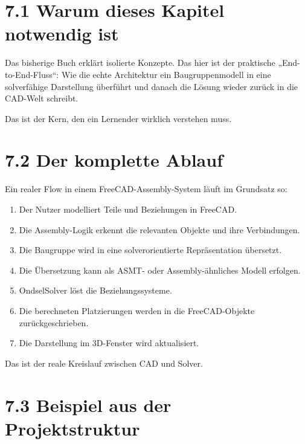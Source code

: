 \documentclass[
  12pt
]{book}
\providecommand{\tightlist}{%
  \setlength{\itemsep}{0pt}\setlength{\parskip}{0pt}}
\begin{document}
\hypertarget{warum-dieses-kapitel-notwendig-ist}{%
\section{\texorpdfstring{{7.1} Warum dieses Kapitel notwendig
ist}{7.1 Warum dieses Kapitel notwendig ist}}\label{warum-dieses-kapitel-notwendig-ist}}

Das bisherige Buch erklärt isolierte Konzepte. Das hier ist der
praktische „End-to-End-Fluss``: Wie die echte Architektur ein
Baugruppenmodell in eine solverfähige Darstellung überführt und danach
die Lösung wieder zurück in die CAD-Welt schreibt.

Das ist der Kern, den ein Lernender wirklich verstehen muss.

\hypertarget{der-komplette-ablauf}{%
\section{\texorpdfstring{{7.2} Der komplette
Ablauf}{7.2 Der komplette Ablauf}}\label{der-komplette-ablauf}}

Ein realer Flow in einem FreeCAD-Assembly-System läuft im Grundsatz so:

\begin{enumerate}
\def\labelenumi{\arabic{enumi}.}
\tightlist
\item
  Der Nutzer modelliert Teile und Beziehungen in FreeCAD.
\item
  Die Assembly-Logik erkennt die relevanten Objekte und ihre
  Verbindungen.
\item
  Die Baugruppe wird in eine solverorientierte Repräsentation übersetzt.
\item
  Die Übersetzung kann als ASMT- oder Assembly-ähnliches Modell
  erfolgen.
\item
  OndselSolver löst die Beziehungssysteme.
\item
  Die berechneten Platzierungen werden in die FreeCAD-Objekte
  zurückgeschrieben.
\item
  Die Darstellung im 3D-Fenster wird aktualisiert.
\end{enumerate}

Das ist der reale Kreislauf zwischen CAD und Solver.

\hypertarget{beispiel-aus-der-projektstruktur}{%
\section{\texorpdfstring{{7.3} Beispiel aus der
Projektstruktur}{7.3 Beispiel aus der Projektstruktur}}\label{beispiel-aus-der-projektstruktur}}
\end{document}
